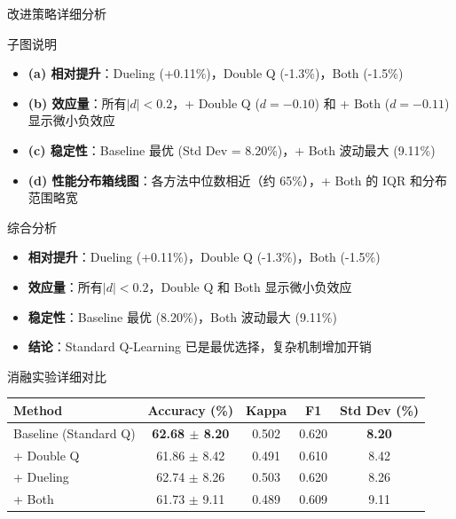 {\begin{frame}{改进策略详细分析}
    \begin{block}{子图说明}
        \footnotesize
        \begin{itemize}
            \item \textbf{(a) 相对提升}：Dueling (+0.11\%)，Double Q (-1.3\%)，Both (-1.5\%)
            \item \textbf{(b) 效应量}：所有$|d| < 0.2$，+ Double Q ($d=-0.10$) 和 + Both ($d=-0.11$) 显示微小负效应
            \item \textbf{(c) 稳定性}：Baseline 最优 (Std Dev = 8.20\%)，+ Both 波动最大 (9.11\%)
            \item \textbf{(d) 性能分布箱线图}：各方法中位数相近（约 65\%），+ Both 的 IQR 和分布范围略宽
        \end{itemize}
    \end{block}

    \vspace{0.2cm}
    \begin{block}{综合分析}
        \footnotesize
        \begin{itemize}
            \item \textbf{相对提升}：Dueling (+0.11\%)，Double Q (-1.3\%)，Both (-1.5\%)
            \item \textbf{效应量}：所有$|d| < 0.2$，Double Q 和 Both 显示微小负效应
            \item \textbf{稳定性}：Baseline 最优 (8.20\%)，Both 波动最大 (9.11\%)
            \item \textbf{结论}：Standard Q-Learning 已是最优选择，复杂机制增加开销
        \end{itemize}
    \end{block}

\end{frame}

\begin{frame}{消融实验详细对比}
    \begin{center}
    \footnotesize
    \renewcommand{\arraystretch}{1.3}
    \begin{tabular}{lcccc}
        \hline
        \textbf{Method} & \textbf{Accuracy (\%)} & \textbf{Kappa} & \textbf{F1} & \textbf{Std Dev (\%)} \\
        \hline
        Baseline (Standard Q) & \textbf{62.68 $\pm$ 8.20} & 0.502 & 0.620 & \textbf{8.20} \\
        + Double Q & 61.86 $\pm$ 8.42 & 0.491 & 0.610 & 8.42 \\
        + Dueling & 62.74 $\pm$ 8.26 & 0.503 & 0.620 & 8.26 \\
        + Both & 61.73 $\pm$ 9.11 & 0.489 & 0.609 & 9.11 \\
        \hline
    \end{tabular}
    \end{center}
\end{frame}

}
